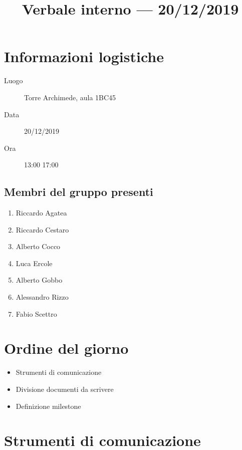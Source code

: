 \documentclass{article}
\title{Verbale interno --- 20/12/2019}
\begin{document}


\section{Informazioni logistiche}%
\label{sec:informazioni_logistiche}

\begin{description}
  \item [Luogo] Torre Archimede, aula 1BC45
  \item [Data] 20/12/2019
  \item [Ora] 13:00  17:00
\end{description}

\subsection{Membri del gruppo presenti}%
\label{sub:membri_del_gruppo_presenti}

\begin{enumerate}
  \item Riccardo Agatea
  \item Riccardo Cestaro
  \item Alberto Cocco
  \item Luca Ercole
  \item Alberto Gobbo
  \item Alessandro Rizzo
  \item Fabio Scettro
\end{enumerate}

\section{Ordine del giorno}%
\label{sec:ordine_del_giorno}

\begin{itemize}
  \item Strumenti di comunicazione
  \item Divisione documenti da scrivere
  \item Definizione milestone
\end{itemize}

\section{Strumenti di comunicazione}%
\label{sec:strumenti_di_comunicazione}
\end{document}
